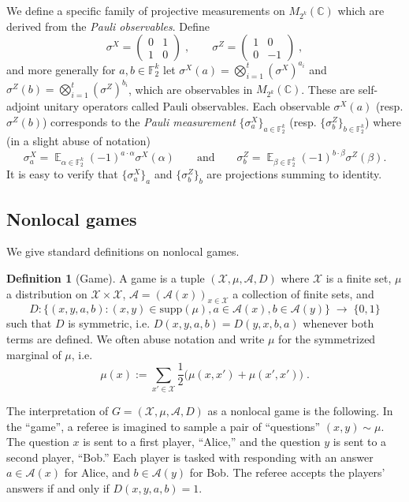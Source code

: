 \documentclass[11pt]{article}
\theoremstyle{definition}
\newtheorem{definition}[theorem]{Definition}
\DeclareMathOperator*{\Expectation}{\mathbb{E}}
\newcommand{\Es}[1]{\Expectation_{#1}}
\newcommand{\C}{\ensuremath{\mathbb{C}}}
\newcommand{\F}{\ensuremath{\mathbb{F}}}
\newcommand{\mA}{\ensuremath{\mathcal{A}}}
\newcommand{\mX}{\ensuremath{\mathcal{X}}}
\begin{document}
	We define a specific family of projective measurements on $M_{2^k}(\C)$ which are derived from the \emph{Pauli observables}. Define
	\[ \sigma^X = \begin{pmatrix} 0 & 1 \\ 1 & 0 \end{pmatrix}\;,\qquad \sigma^Z = \begin{pmatrix} 1 & 0 \\ 0 & -1\end{pmatrix}\;,\]
	and more generally for $a,b\in \F_2^k$ let $\sigma^X(a) = \bigotimes_{i=1}^t (\sigma^X)^{a_i}$ and $\sigma^Z(b) = \bigotimes_{i=1}^t (\sigma^Z)^{b_i}$, which are observables in $M_{2^k}(\C)$. These are self-adjoint unitary operators called Pauli observables. Each observable $\sigma^X(a)$ (resp. $\sigma^Z(b)$) corresponds to the \emph{Pauli measurement} $\{ \sigma^X_a \}_{a \in \F_2^k}$ (resp. $\{ \sigma^Z_b \}_{b \in \F_2^k}$) where (in a slight abuse of notation)  
	\[ \sigma^X_a = \Es{\alpha\in\F_2^k} (-1)^{a\cdot \alpha} \sigma^X(\alpha)\qquad\text{and}\qquad\sigma^Z_b = \Es{\beta\in\F_2^k} (-1)^{b\cdot\beta} \sigma^Z(\beta).\]
	It is easy to verify that $\{\sigma^X_a\}_a$ and $\{\sigma^Z_b\}_b$ are projections summing to identity.	
	
	
\subsection{Nonlocal games}

We give standard definitions on nonlocal games. 

\begin{definition}[Game]
A game is a tuple $(\mX,\mu,\mA,D)$ where $\mX$ is a finite set, $\mu$ a distribution on $\mX\times \mX$, $\mA=(\mA(x))_{x\in\mX}$ a collection of finite sets, and 
\[ D: \big\{ (x,y,a,b) : (x,y)\in\text{supp}(\mu),a\in\mA(x),b\in\mA(y)\big\} \;\to\;\{0,1\}\]
such that $D$ is symmetric, i.e. $D(x,y,a,b)=D(y,x,b,a)$ whenever both terms are defined. We often abuse notation and write $\mu$ for the symmetrized marginal of $\mu$, i.e.\ 
\[\mu(x) := \sum_{x'\in \mX} \frac{1}{2}\big(\mu(x,x')+\mu(x',x')\big)\;.\]
\end{definition}

The interpretation of $G=(\mX,\mu,\mA,D)$ as a nonlocal game is the following. In the ``game'', a referee is imagined to sample a pair of ``questions'' $(x,y)\sim \mu$. The question $x$ is sent to a first player, ``Alice,'' and the question $y$ is sent to a second player, ``Bob.'' Each player is tasked with responding with an answer $a\in \mA(x)$ for Alice, and $b\in \mA(y)$ for Bob. The referee accepts the players' answers if and only if $D(x,y,a,b)=1$. 
\end{document}
